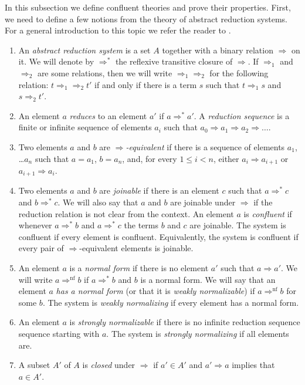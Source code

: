 \documentclass[reqno]{amsart}
\theoremstyle{definition}
\theoremstyle{remark}
\newcommand{\nf}{\mathrm{nf}}
\numberwithin{figure}{section}
\begin{document}
In this subsection we define confluent theories and prove their properties.
First, we need to define a few notions from the theory of abstract reduction systems.
For a general introduction to this topic we refer the reader to \cite{Terese,klop-trs,ohlebusch-advanced}.
\begin{enumerate}
\item An \emph{abstract reduction system} is a set $A$ together with a binary relation $\Rightarrow$ on it.
We will denote by $\Rightarrow^*$ the reflexive transitive closure of $\Rightarrow$.
If $\Rightarrow_1$ and $\Rightarrow_2$ are some relations, then we will write $\Rightarrow_1 \Rightarrow_2$ for the following relation:
$t \Rightarrow_1 \Rightarrow_2 t'$ if and only if there is a term $s$ such that $t \Rightarrow_1 s$ and $s \Rightarrow_2 t'$.
\item An element $a$ \emph{reduces} to an element $a'$ if $a \Rightarrow^* a'$.
A \emph{reduction sequence} is a finite or infinite sequence of elements $a_i$ such that $a_0 \Rightarrow a_1 \Rightarrow a_2 \Rightarrow \ldots$.
\item Two elements $a$ and $b$ are \emph{$\Rightarrow$-equivalent} if there is a sequence of elements $a_1$, \ldots $a_n$ such that $a = a_1$, $b = a_n$,
and, for every $1 \leq i < n$, either $a_i \Rightarrow a_{i+1}$ or $a_{i+1} \Rightarrow a_i$.
\item Two elements $a$ and $b$ are \emph{joinable} if there is an element $c$ such that $a \Rightarrow^* c$ and $b \Rightarrow^* c$.
We will also say that $a$ and $b$ are joinable under $\Rightarrow$ if the reduction relation is not clear from the context.
An element $a$ is \emph{confluent} if whenever $a \Rightarrow^* b$ and $a \Rightarrow^* c$ the terms $b$ and $c$ are joinable.
The system is confluent if every element is confluent.
Equivalently, the system is confluent if every pair of $\Rightarrow$-equivalent elements is joinable.
\item An element $a$ is a \emph{normal form} if there is no element $a'$ such that $a \Rightarrow a'$.
We will write $a \Rightarrow^\nf b$ if $a \Rightarrow^* b$ and $b$ is a normal form.
We will say that an element $a$ \emph{has a normal form} (or that it is \emph{weakly normalizable}) if $a \Rightarrow^\nf b$ for some $b$.
The system is \emph{weakly normalizing} if every element has a normal form.
\item An element $a$ is \emph{strongly normalizable} if there is no infinite reduction sequence sequence starting with $a$.
The system is \emph{strongly normalizing} if all elements are.
\item A subset $A'$ of $A$ is \emph{closed} under $\Rightarrow$ if $a' \in A'$ and $a' \Rightarrow a$ implies that $a \in A'$.
\end{enumerate}
\end{document}
